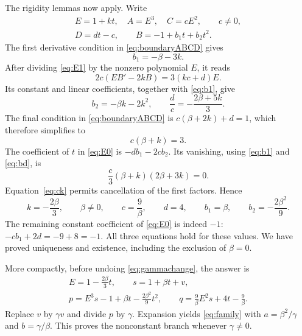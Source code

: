 \documentclass[11pt,a4paper]{article}
\numberwithin{equation}{section}
\theoremstyle{definition}
\theoremstyle{remark}
\begin{document}
The rigidity lemmas now apply. Write
\begin{equation}\label{eq:linearforms}
\begin{gathered}
E=1+kt,\quad A=E^3,\quad C=cE^2,\qquad c\ne0,\\
D=dt-c,\qquad B=-1+b_1t+b_2t^2.
\end{gathered}
\end{equation}
The first derivative condition in \eqref{eq:boundaryABCD} gives
\begin{equation}\label{eq:b1}
b_1=-\beta-3k.
\end{equation}
After dividing \eqref{eq:E1} by the nonzero polynomial $E$, it reads
\begin{equation}\label{eq:keylinear}
2c(EB'-2kB)=3(kc+d)E.
\end{equation}
Its constant and linear coefficients, together with \eqref{eq:b1}, give
\begin{equation}\label{eq:bd}
b_2=-\beta k-2k^2,\qquad
\frac dc=-\frac{2\beta+5k}{3}.
\end{equation}
The final condition in \eqref{eq:boundaryABCD} is
$c(\beta+2k)+d=1$, which therefore simplifies to
\begin{equation}\label{eq:ck}
c(\beta+k)=3.
\end{equation}
The coefficient of $t$ in \eqref{eq:E0} is $-db_1-2cb_2$. Its vanishing,
using \eqref{eq:b1} and \eqref{eq:bd}, is
\[
\frac c3(\beta+k)(2\beta+3k)=0.
\]
Equation~\eqref{eq:ck} permits cancellation of the first factors. Hence
\begin{equation}\label{eq:endpoint}
k=-\frac{2\beta}{3},\qquad
\beta\ne0,\qquad c=\frac9\beta,\qquad d=4,
\qquad b_1=\beta,\qquad b_2=-\frac{2\beta^2}{9}.
\end{equation}
The remaining constant coefficient of \eqref{eq:E0} is indeed $-1$:
$-cb_1+2d=-9+8=-1$. All three equations hold for these values. We have proved
uniqueness and existence, including the exclusion of $\beta=0$.

More compactly, before undoing \eqref{eq:gammachange}, the answer is
\begin{equation}\label{eq:compactendpoint}
\begin{gathered}
E=1-\frac{2\beta}{3}t,\qquad s=1+\beta t+v,\\
p=E^3s-1+\beta t-\frac{2\beta^2}{9}t^2,\qquad
q=\frac9\beta E^2s+4t-\frac9\beta.
\end{gathered}
\end{equation}
Replace $v$ by $\gamma v$ and divide $p$ by $\gamma$. Expansion yields
\eqref{eq:family} with $a=\beta^2/\gamma$ and $b=\gamma/\beta$.
This proves the nonconstant branch whenever $\gamma\ne0$.
\end{document}
